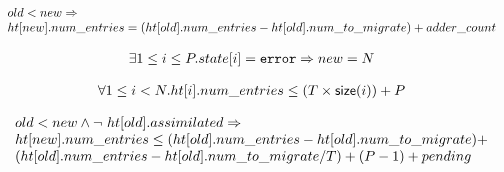 \begin{lemma}
  \begin{equation*}
    \begin{array}{l}  
      old < new \Rightarrow \\
  \mbox{$ht[new]$}.num\_entries = (\mbox{$ht[old]$}.num\_entries - \mbox{$ht[old]$}.num\_to\_migrate) + adder\_count
\end{array}
\end{equation*}
  \label{upper_strengthening3}  
\end{lemma}

\begin{lemma}
  \begin{equation*}
\begin{array}{l}      
  \exists 1 \leq i \leq P. state[i] = \mbox{\texttt{error}} \Rightarrow new = N
\end{array}
\end{equation*}  
  \label{out_of_mem}  
\end{lemma}


\begin{lemma}
  \begin{equation*}
\begin{array}{l}      
  \forall 1 \leq i < N. \mbox{$ht[i]$}.num\_entries \leq (T \times \mathsf{size}(i)) + P
\end{array}
  \end{equation*}
  \label{upper_global}
\end{lemma}

\begin{lemma}
  \begin{equation*}
\begin{array}{l}    
  old < new \wedge \mbox{$\neg\ \mbox{$ht[old]$}.assimilated$} \Rightarrow \\
  \mbox{$ht[new]$}.num\_entries \leq (\mbox{$ht[old]$}.num\_entries - \mbox{$ht[old]$}.num\_to\_migrate) + \\
  (\mbox{$ht[old]$}.num\_entries - \mbox{$ht[old]$}.num\_to\_migrate / T) + (P-1) + pending
\end{array}
\end{equation*}
  \label{upper}
\end{lemma}

